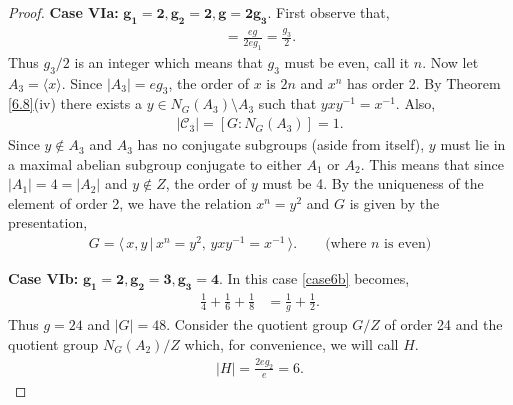 \documentclass[a4paper , 11pt]{book}
\theoremstyle{definition}
\theoremstyle{remark}
\begin{document}
\begin{proof}
\textbullet \space \textbf{Case VIa:} $\pmb{g_1 = 2, g_2 = 2, g=2 g_3}$. First observe that,
\begin{align*} [G : N_G(A_1)] = \frac{eg}{2eg_1} = \frac{g_3}{2}.
\end{align*}
Thus $g_3/2$ is an integer which means that $g_3$ must be even, call it $n$. Now let $A_3 = \langle x \rangle$. Since $|A_3| = eg_3$, the order of $x$ is $2n$ and $x^n$ has order 2. By Theorem \eqref{6.8}(iv) there exists a $y \in N_G(A_3) \! \setminus \! A_3$ such that $y x y^{-1} = x^{-1}$. Also,
\begin{align*} |\mathcal{C}_3| = [G : N_G(A_3)] = 1.
\end{align*}
Since $y \not \in A_3$ and $A_3$ has no conjugate subgroups (aside from itself), $y$ must lie in a maximal abelian subgroup conjugate to either $A_1$ or $A_2$. This means that since $|A_1| = 4 = |A_2|$ and $y \not \in Z$, the order of $y$ must be 4. By the uniqueness of the element of order 2, we have the relation $x^n = y^2$ and $G$ is given by the presentation,
\begin{align*} G = \langle \, x,y \, | \, x^n = y^2, \, yxy^{-1} = x^{-1} \, \rangle. \qquad \text{(where $n$ is even)}
\end{align*}

\textbullet \space \textbf{Case VIb:} $\pmb{g_1 = 2, g_2 = 3, g_3 = 4}$. In this case \eqref{case6b} becomes,
\begin{align*} \frac{1}{4} + \frac{1}{6} + \frac{1}{8} &= \frac{1}{g} + \frac{1}{2}.
\end{align*}
Thus $g = 24$ and $|G| = 48$. Consider the quotient group $G / Z$ of order 24 and the quotient group $N_G(A_2) / Z$ which, for convenience, we will call $H$.
\begin{align*} |H| = \frac{2eg_2}{e} = 6.
\end{align*}


\end{proof}
\end{document}
